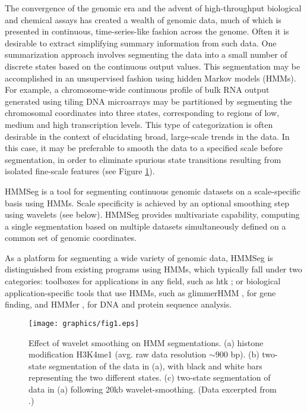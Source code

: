 \documentclass{bioinfo}
\begin{document}
The convergence of the genomic era and the advent of
high-throughput biological and chemical assays has created a wealth of
genomic data, much of which is presented in continuous,
time-series-like fashion across the genome.  Often it is desirable to
extract simplifying summary information from such data.  One
summarization approach involves segmenting the data into a small
number of discrete states based on the continuous output values.  This
segmentation may be accomplished in an unsupervised fashion using
hidden Markov models (HMMs).  For example, a chromosome-wide
continuous profile of bulk RNA output generated using tiling DNA
microarrays may be partitioned by segmenting the chromosomal
coordinates into three states, corresponding to regions of low, medium
and high transcription levels.  This type of categorization is often
desirable in the context of elucidating broad, large-scale trends in
the data.  In this case, it may be preferable to smooth the data to a
specified scale before segmentation, in order to eliminate spurious
state transitions resulting from isolated fine-scale features (see
Figure \ref{scales}).

HMMSeg is a tool for segmenting continuous genomic datasets on a
scale-specific basis using HMMs.  Scale specificity is achieved by an
optional smoothing step using wavelets (see below).  HMMSeg provides
multivariate capability, computing a single segmentation based on
multiple datasets simultaneously defined on a common set of genomic
coordinates.  

As a platform for segmenting a wide variety of genomic data, HMMSeg is
distinguished from existing programs using HMMs, which typically fall
under two categories: toolboxes for applications in any field, such as
htk \citep{young:htk}; or biological application-specific tools that
use HMMs, such as glimmerHMM \citep{majoros:tigrscan}, for gene
finding, and HMMer \citep{eddy:hmmer}, for DNA and protein sequence
analysis.


\begin{figure}
  \centering
  \texttt{[image: graphics/fig1.eps]}
  \caption{Effect of wavelet smoothing on HMM segmentations.  (a)
  histone modification H3K4me1 (avg. raw data resolution $\sim900$
  bp).  (b) two-state segmentation of the data in (a), with black and
  white bars representing the two different states. (c) two-state
  segmentation of data in (a) following 20kb wavelet-smoothing. (Data
  excerpted from \citep{thurman:identification}.)}
  \label{scales}
\end{figure}
\end{document}
